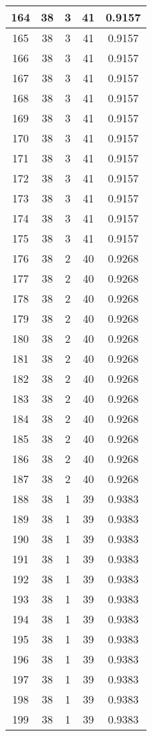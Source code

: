 \documentclass[letterpaper, 12pt]{article}
\begin{document}
\begin{longtable}{|c|c|c|c|c|}
\hline
164 & 38 & 3 & 41 & 0.9157 \\
\hline
165 & 38 & 3 & 41 & 0.9157 \\
\hline
166 & 38 & 3 & 41 & 0.9157 \\
\hline
167 & 38 & 3 & 41 & 0.9157 \\
\hline
168 & 38 & 3 & 41 & 0.9157 \\
\hline
169 & 38 & 3 & 41 & 0.9157 \\
\hline
170 & 38 & 3 & 41 & 0.9157 \\
\hline
171 & 38 & 3 & 41 & 0.9157 \\
\hline
172 & 38 & 3 & 41 & 0.9157 \\
\hline
173 & 38 & 3 & 41 & 0.9157 \\
\hline
174 & 38 & 3 & 41 & 0.9157 \\
\hline
175 & 38 & 3 & 41 & 0.9157 \\
\hline
176 & 38 & 2 & 40 & 0.9268 \\
\hline
177 & 38 & 2 & 40 & 0.9268 \\
\hline
178 & 38 & 2 & 40 & 0.9268 \\
\hline
179 & 38 & 2 & 40 & 0.9268 \\
\hline
180 & 38 & 2 & 40 & 0.9268 \\
\hline
181 & 38 & 2 & 40 & 0.9268 \\
\hline
182 & 38 & 2 & 40 & 0.9268 \\
\hline
183 & 38 & 2 & 40 & 0.9268 \\
\hline
184 & 38 & 2 & 40 & 0.9268 \\
\hline
185 & 38 & 2 & 40 & 0.9268 \\
\hline
186 & 38 & 2 & 40 & 0.9268 \\
\hline
187 & 38 & 2 & 40 & 0.9268 \\
\hline
188 & 38 & 1 & 39 & 0.9383 \\
\hline
189 & 38 & 1 & 39 & 0.9383 \\
\hline
190 & 38 & 1 & 39 & 0.9383 \\
\hline
191 & 38 & 1 & 39 & 0.9383 \\
\hline
192 & 38 & 1 & 39 & 0.9383 \\
\hline
193 & 38 & 1 & 39 & 0.9383 \\
\hline
194 & 38 & 1 & 39 & 0.9383 \\
\hline
195 & 38 & 1 & 39 & 0.9383 \\
\hline
196 & 38 & 1 & 39 & 0.9383 \\
\hline
197 & 38 & 1 & 39 & 0.9383 \\
\hline
198 & 38 & 1 & 39 & 0.9383 \\
\hline
199 & 38 & 1 & 39 & 0.9383 \\
\hline
\end{longtable}
\end{document}
